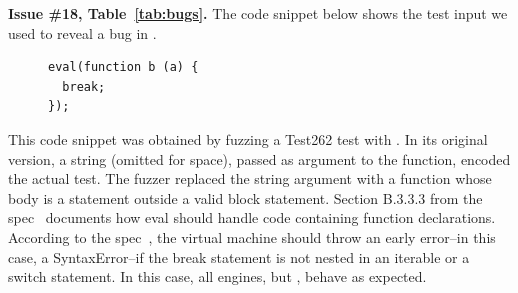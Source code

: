 \documentclass[10pt,conference,anonymous]{IEEEtran}
\begin{document}
\vspace{1ex}\noindent\textbf{Issue \#18, Table~\ref{tab:bugs}.}  The
code snippet below shows the test input we used to reveal a bug in
\veight{}.

\begin{figure}[h!]
  \centering
  \scriptsize
  \begin{lstlisting}
eval(function b (a) {
  break;
});
  \end{lstlisting}
  \normalsize
\end{figure}

This code snippet was obtained by fuzzing a Test262 test with
\quickfuzz. In its original version, a string (omitted for space),
passed as argument to the  function, encoded the actual
test. The fuzzer replaced the string argument with a function whose
body is a  statement outside a valid block
statement. Section B.3.3.3 from the spec~\cite{spec-b333} documents
how eval should handle code containing function declarations.
According to the spec~\cite{break-statement}, the virtual machine
should throw an early error--in this case, a SyntaxError--if the break
statement is not nested in an iterable or a switch statement. In this
case, all engines, but \veight{}, behave as expected.

\end{document}
